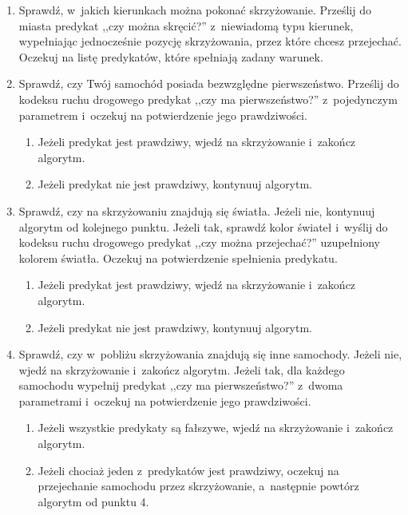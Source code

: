 \documentclass[a4paper,11pt]{article}
\begin{document}
\begin{enumerate}
    \item Sprawdź, w~jakich kierunkach można pokonać skrzyżowanie. Prześlij do miasta predykat ,,czy można skręcić?'' z~niewiadomą typu kierunek, wypełniając jednocześnie pozycję skrzyżowania, przez które chcesz przejechać. Oczekuj na listę predykatów, które spełniają zadany warunek.
    \item Sprawdź, czy Twój samochód posiada bezwzględne pierwszeństwo. Prześlij do kodeksu ruchu drogowego predykat ,,czy ma pierwszeństwo?'' z~pojedynczym parametrem i~oczekuj na potwierdzenie jego prawdziwości.
        
        \begin{enumerate}
            \item Jeżeli predykat jest prawdziwy, wjedź na skrzyżowanie i~zakończ algorytm.
            \item Jeżeli predykat nie jest prawdziwy, kontynuuj algorytm.
        \end{enumerate}
        
    \item Sprawdź, czy na skrzyżowaniu znajdują się światła. Jeżeli nie, kontynuuj algorytm od kolejnego punktu. Jeżeli tak, sprawdź kolor świateł i~wyślij do kodeksu ruchu drogowego predykat ,,czy można przejechać?'' uzupełniony kolorem światła. Oczekuj na potwierdzenie spełnienia predykatu.
        
        \begin{enumerate}
            \item Jeżeli predykat jest prawdziwy, wjedź na skrzyżowanie i~zakończ algorytm.
            \item Jeżeli predykat nie jest prawdziwy, kontynuuj algorytm.
        \end{enumerate}
        
    \item Sprawdź, czy w~pobliżu skrzyżowania znajdują się inne samochody. Jeżeli nie, wjedź na skrzyżowanie i~zakończ algorytm. Jeżeli tak, dla każdego samochodu wypełnij predykat ,,czy ma pierwszeństwo?'' z~dwoma parametrami i~oczekuj na potwierdzenie jego prawdziwości.
        
        \begin{enumerate}
            \item Jeżeli wszystkie predykaty są fałszywe, wjedź na skrzyżowanie i~zakończ algorytm.
            \item Jeżeli chociaż jeden z~predykatów jest prawdziwy, oczekuj na przejechanie samochodu przez skrzyżowanie, a~następnie powtórz algorytm od punktu 4.
        \end{enumerate}
\end{enumerate}
\end{document}
